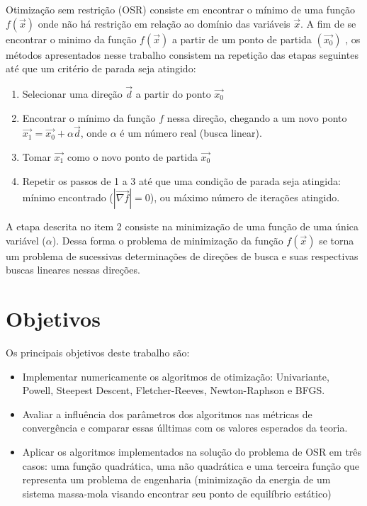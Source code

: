 \documentclass[10pt, a4paper]{article}
\begin{document}
Otimiza\c c\~ao sem restri\c c\~ao (OSR) consiste em encontrar o m\'inimo de uma fun\c c\~ao $f(\vec{x})$ onde n\~ao h\'a restri\c c\~ao em rela\c c\~ao ao dom\'inio das vari\'aveis $\vec{x}$. A fim de se encontrar o minimo da fun\c c\~ao $f(\vec{x})$ a partir de um ponto de partida $(\vec{x_{0}})$ , os m\'etodos apresentados nesse trabalho consistem na repeti\c c\~ao das etapas seguintes at\'e que um crit\'erio de parada seja atingido:
\begin{enumerate}
      \item Selecionar uma dire\c c\~ao $\vec{d}$ a partir do ponto $\vec{x_{0}}$
      \item Encontrar o m\'inimo da fun\c c\~ao $f$ nessa dire\c c\~ao, chegando a um novo ponto $\vec{x_{1}} = \vec{x_{0}} + \alpha\vec{d}$, onde $\alpha$ \'e um n\'umero real (busca linear).
      \item Tomar $\vec{x_{1}}$ como o novo ponto de partida $\vec{x_{0}}$
      \item Repetir os passos de 1 a 3 at\'e que uma condi\c c\~ao de parada seja atingida: m\'inimo encontrado ($|\vec{\nabla f}|=0$), ou m\'aximo n\'umero de itera\c c\~oes atingido.
\end{enumerate}

A etapa descrita no item 2 consiste na minimiza\c c\~ao de uma fun\c c\~ao de uma \'unica vari\'avel ($\alpha$). Dessa forma o problema de minimiza\c c\~ao da fun\c c\~ao $f(\vec{x})$ se torna um problema de sucessivas determina\c c\~oes de dire\c c\~oes de busca e suas respectivas buscas lineares nessas dire\c c\~oes.

\section{Objetivos}

Os principais objetivos deste trabalho s\~ao:
\begin{itemize}
      \item Implementar numericamente os algoritmos de otimiza\c c\~ao: Univariante, Powell, Steepest Descent, Fletcher-Reeves, Newton-Raphson e BFGS.
      \item Avaliar a influ\^encia dos par\^ametros dos algoritmos nas m\'etricas de converg\^encia e comparar essas \'ulltimas com os valores esperados da teoria.
      \item Aplicar os algoritmos implementados na solu\c c\~ao do problema de OSR em tr\^es casos: uma fun\c c\~ao quadr\'atica, uma n\~ao quadr\'atica e uma terceira fun\c c\~ao que representa um problema de engenharia (minimiza\c c\~ao da energia de um sistema massa-mola visando encontrar seu ponto de equil\'ibrio est\'atico)
\end{itemize}
\end{document}
